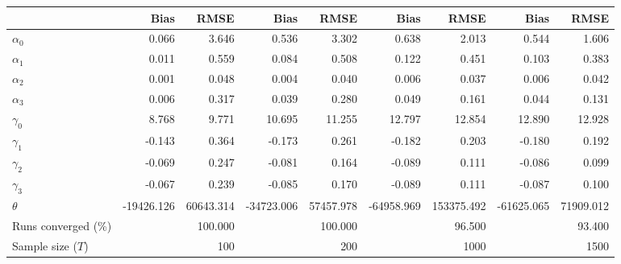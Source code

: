
\begin{tabular}[t]{lrrrrrrrr}
\toprule
  & Bias & RMSE & Bias & RMSE & Bias & RMSE & Bias & RMSE\\
\midrule
$\alpha_{0}$ & 0.066 & 3.646 & 0.536 & 3.302 & 0.638 & 2.013 & 0.544 & 1.606\\
$\alpha_{1}$ & 0.011 & 0.559 & 0.084 & 0.508 & 0.122 & 0.451 & 0.103 & 0.383\\
$\alpha_{2}$ & 0.001 & 0.048 & 0.004 & 0.040 & 0.006 & 0.037 & 0.006 & 0.042\\
$\alpha_{3}$ & 0.006 & 0.317 & 0.039 & 0.280 & 0.049 & 0.161 & 0.044 & 0.131\\
$\gamma_{0}$ & 8.768 & 9.771 & 10.695 & 11.255 & 12.797 & 12.854 & 12.890 & 12.928\\
$\gamma_{1}$ & -0.143 & 0.364 & -0.173 & 0.261 & -0.182 & 0.203 & -0.180 & 0.192\\
$\gamma_{2}$ & -0.069 & 0.247 & -0.081 & 0.164 & -0.089 & 0.111 & -0.086 & 0.099\\
$\gamma_{3}$ & -0.067 & 0.239 & -0.085 & 0.170 & -0.089 & 0.111 & -0.087 & 0.100\\
$\theta$ & -19426.126 & 60643.314 & -34723.006 & 57457.978 & -64958.969 & 153375.492 & -61625.065 & 71909.012\\
Runs converged (\%) &  & 100.000 &  & 100.000 &  & 96.500 &  & 93.400\\
Sample size ($T$) &  & 100 &  & 200 &  & 1000 &  & 1500\\
\bottomrule
\end{tabular}
